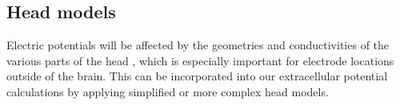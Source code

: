 \documentclass[preprint,10pt,authoryear]{elsarticle}
\newcommand{\sntxt}[1]{{\color{NavyBlue}#1}}
\begin{document}
%
%
%
%
%
%
%
%
%


\subsection{Head models}
Electric potentials will be affected by the geometries and conductivities of the various parts of the head \citep{NUNEZ2006}\sntxt{, which is especially important for electrode locations outside of the brain. This can be incorporated into our extracellular potential calculations by applying simplified or more complex head models}.
\end{document}
